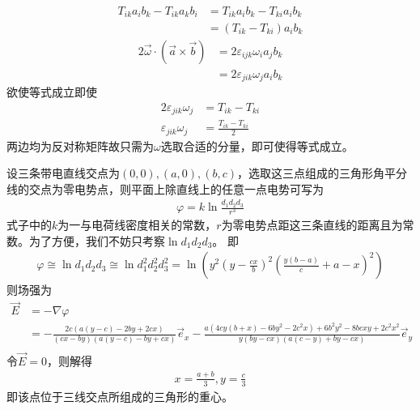\documentclass{phyasgn}
\begin{document}
\begin{sol}[8]
    \begin{align*}
    T_{ik}a_ib_k-T_{ik}a_kb_i&=T_{ik}a_ib_k-T_{ki}a_ib_k\\
    &=(T_{ik}-T_{ki})a_ib_k
    \end{align*}
    \begin{align*}
        2\vec{\omega}\cdot(\vec{a}\times\vec{b})&=2\varepsilon_{ijk}\omega_ia_jb_k\\
        &=2\varepsilon_{jik}\omega_ja_ib_k
    \end{align*}
    欲使等式成立即使
    \begin{align*}
        2\varepsilon_{jik}\omega_j&=T_{ik}-T_{ki}\\
        \varepsilon_{jik}\omega_j&=\frac{T_{ik}-T_{ki}}{2}
    \end{align*}
    两边均为反对称矩阵故只需为$\omega$选取合适的分量，即可使得等式成立。
\end{sol}\par

\begin{sol}[9]
    设三条带电直线交点为$(0,0),(a,0),(b,c)$，选取这三点组成的三角形角平分线的交点为零电势点，则平面上除直线上的任意一点电势可写为
    \begin{align*}
        \varphi=k\ln \frac{d_1d_2d_3}{r^3}
    \end{align*}
    式子中的$k$为一与电荷线密度相关的常数，$r$为零电势点距这三条直线的距离且为常数。为了方便，我们不妨只考察$\ln d_1d_2d_3$。
    即\begin{align*}
        \varphi\cong \ln d_1d_2d_3\cong \ln d_1^2d_2^2d_3^2=\ln \left(y^2 \left(y-\frac{c x}{b}\right)^2 \left(\frac{y (b-a)}{c}+a-x\right)^2\right)
    \end{align*}
    则场强为
    \begin{align*}
        \vec{E}&=-\nabla\varphi\\
        &=-\frac{2 c (a (y-c)-2 b y+2 c x)}{(c x-b y) (a (y-c)-b y+c x)}\vec{e}_x-\frac{a \left(4 c y (b+x)-6 b y^2-2 c^2 x\right)+6 b^2 y^2-8 b c x y+2 c^2 x^2}{y (b y-c x) (a (c-y)+b y-c x)}\vec{e}_y\\
    \end{align*}
    令$\vec{E}=0$，则解得
    \begin{align*}
        x=\frac{a+b}{3},y=\frac{c}{3}
    \end{align*}
    即该点位于三线交点所组成的三角形的重心。
\end{sol}\par
\end{document}
